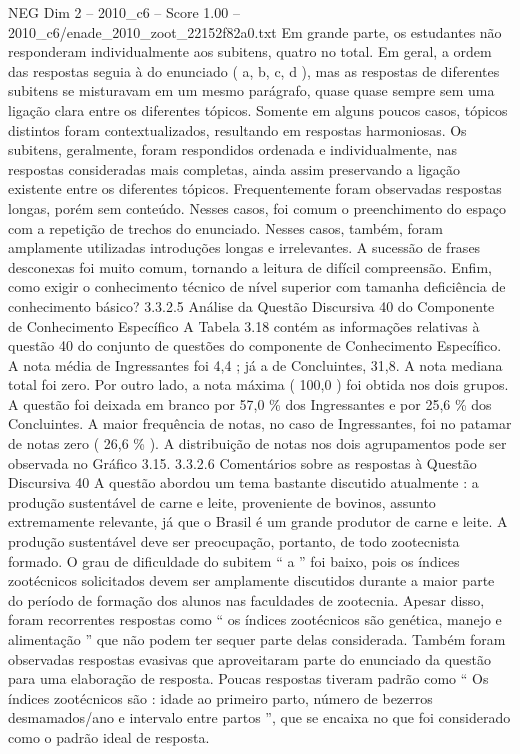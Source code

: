 \begin{textsample}{NEG Dim 2 – 2010\_c6 – Score 1.00 – 2010\_c6/enade\_2010\_zoot\_22152f82a0.txt}
Em grande parte, os estudantes não responderam individualmente aos subitens, quatro no total.
Em geral, a ordem das respostas seguia à do enunciado ( a, b, c, d ), mas as respostas de diferentes subitens se misturavam em um mesmo parágrafo, quase quase sempre sem uma ligação clara entre os diferentes tópicos.
Somente em alguns poucos casos, tópicos distintos foram contextualizados, resultando em respostas harmoniosas.
Os subitens, geralmente, foram respondidos ordenada e individualmente, nas respostas consideradas mais completas, ainda assim preservando a ligação existente entre os diferentes tópicos.
Frequentemente foram observadas respostas longas, porém sem conteúdo.
Nesses casos, foi comum o preenchimento do espaço com a repetição de trechos do enunciado.
Nesses casos, também, foram amplamente utilizadas introduções longas e irrelevantes.
A sucessão de frases desconexas foi muito comum, tornando a leitura de difícil compreensão.
Enfim, como exigir o conhecimento técnico de nível superior com tamanha deficiência de conhecimento básico? 3.3.2.5 Análise da Questão Discursiva 40 do Componente de Conhecimento Específico A Tabela 3.18 contém as informações relativas à questão 40 do conjunto de questões do componente de Conhecimento Específico.
A nota média de Ingressantes foi 4,4 ; já a de Concluintes, 31,8.
A nota mediana total foi zero.
Por outro lado, a nota máxima ( 100,0 ) foi obtida nos dois grupos.
A questão foi deixada em branco por 57,0 \% dos Ingressantes e por 25,6 \% dos Concluintes.
A maior frequência de notas, no caso de Ingressantes, foi no patamar de notas zero ( 26,6 \% ).
A distribuição de notas nos dois agrupamentos pode ser observada no Gráfico 3.15. 3.3.2.6 Comentários sobre as respostas à Questão Discursiva 40 A questão abordou um tema bastante discutido atualmente : a produção sustentável de carne e leite, proveniente de bovinos, assunto extremamente relevante, já que o Brasil é um grande produtor de carne e leite.
A produção sustentável deve ser preocupação, portanto, de todo zootecnista formado.
O grau de dificuldade do subitem “ a ” foi baixo, pois os índices zootécnicos solicitados devem ser amplamente discutidos durante a maior parte do período de formação dos alunos nas faculdades de zootecnia.
Apesar disso, foram recorrentes respostas como “ os índices zootécnicos são genética, manejo e alimentação ” que não podem ter sequer parte delas considerada.
Também foram observadas respostas evasivas que aproveitaram parte do enunciado da questão para uma elaboração de resposta.
Poucas respostas tiveram padrão como “ Os índices zootécnicos são : idade ao primeiro parto, número de bezerros desmamados/ano e intervalo entre partos ”, que se encaixa no que foi considerado como o padrão ideal de resposta.

\end{textsample}
